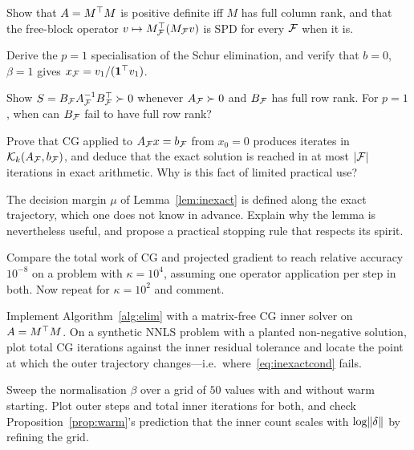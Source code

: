 \begin{exercises}

\begin{exercise}
Show that $A = M^{\top} M$ is positive definite iff $M$ has full column rank, and that
the free-block operator $v \mapsto M_{\mathcal{F}}^{\top}(M_{\mathcal{F}} v)$ is SPD for every $\mathcal{F}$
when it is.
\end{exercise}

\begin{exercise}
Derive the $p = 1$ specialisation of the Schur elimination, and verify that
$b = 0$, $\beta = 1$ gives $x_{\mathcal{F}} = v_1/(\mathbf{1}^{\top} v_1)$.
\end{exercise}

\begin{exercise}
Show $S = B_{\mathcal{F}} A_{\mathcal{F}}^{-1} B_{\mathcal{F}}^{\top} \succ 0$ whenever $A_{\mathcal{F}} \succ 0$ and
$B_{\mathcal{F}}$ has full row rank. For $p = 1$, when can $B_{\mathcal{F}}$ fail to have full row
rank?
\end{exercise}

\begin{exercise}
Prove that CG applied to $A_{\mathcal{F}} x = b_{\mathcal{F}}$ from $x_0 = 0$ produces iterates in
$\mathcal{K}_k(A_{\mathcal{F}}, b_{\mathcal{F}})$, and deduce that the exact solution is reached in at
most $|\mathcal{F}|$ iterations in exact arithmetic. Why is this fact of limited practical
use?
\end{exercise}

\begin{exercise}
The decision margin $\mu$ of Lemma~\ref{lem:inexact} is defined along the exact
trajectory, which one does not know in advance. Explain why the lemma is
nevertheless useful, and propose a practical stopping rule that respects its spirit.
\end{exercise}

\begin{exercise}
Compare the total work of CG and projected gradient to reach relative accuracy
$10^{-8}$ on a problem with $\kappa = 10^{4}$, assuming one operator application per
step in both. Now repeat for $\kappa = 10^2$ and comment.
\end{exercise}

\begin{exercise}[Implementation]
Implement Algorithm~\ref{alg:elim} with a matrix-free CG inner solver on
$A = M^{\top} M$. On a synthetic NNLS problem with a planted non-negative solution, plot
total CG iterations against the inner residual tolerance and locate the point at
which the outer trajectory changes---i.e.\ where~\eqref{eq:inexactcond} fails.
\end{exercise}

\begin{exercise}[Implementation]
Sweep the normalisation $\beta$ over a grid of $50$ values with and without warm
starting. Plot outer steps and total inner iterations for both, and check
Proposition~\ref{prop:warm}'s prediction that the inner count scales with
$\log\lVert \delta \rVert$ by refining the grid.
\end{exercise}

\end{exercises}
